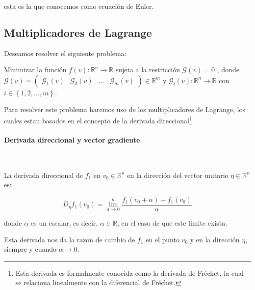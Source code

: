             esta es la que conocemos como ecuación de Euler.


        \subsection{Multiplicadores de Lagrange}

            Deseamos resolver el siguiente problema:

            Minimizar la función
            $f(v):\mathbb{R}^n \to \mathbb{R}$ sujeta a la restricción $\mathscr{G}(v) = 0$
            , donde $\mathscr{G}(v)=\begin{pmatrix}\mathscr{G}_1(v) & \mathscr{G}_2(v) & \dots & \mathscr{G}_m(v) \end{pmatrix} \in \mathbb{R}^m$
             y $\mathscr{G}_i(v): \mathbb{R}^n \to \mathbb{R}$
             con $i \in \left\{ 1, 2, \dots, m \right\}$.

            Para resolver este problema haremos uso de los multiplicadores de Lagrange, los cuales estan basados en el concepto de la derivada direccional\footnote{Esta derivada es formalmente conocida como la derivada de Fréchet, la cual se relaciona linealmente con la diferencial de Fréchet.}

            \paragraph{Derivada direccional y vector gradiente}\mbox{}\\

                \begin{definicion}
                    La derivada direccional de $f_1$ en $v_0 \in \mathbb{R}^n$ en la dirección del vector unitario $\eta \in \mathbb{R}^n$ es:

                    \begin{equation}
                        D_{\eta} f_1(v_0) = \lim_{\alpha \to 0}^{n}  \frac{f_1(v_0 + \alpha) - f_1(v_0)}{\alpha}
                    \end{equation}

                    donde $\alpha$ es un escalar, es decir, $\alpha \in \mathbb{R}$, en el caso de que este limite exista.

                    Esta derivada nos da la razon de cambio de $f_1$ en el punto $v_0$ y en la dirección $\eta$, siempre y cuando $\alpha \to 0$.
                \end{definicion}


